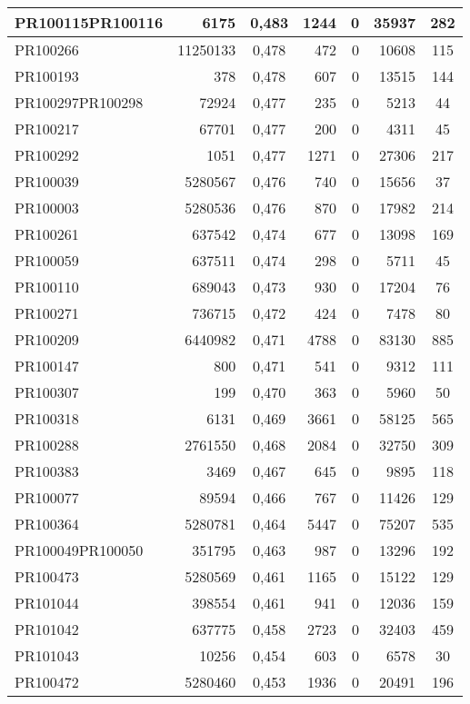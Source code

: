 \begin{center}
\begin{longtable}{lr|c|rrr|c}
	PR100115PR100116 & 6175 & 0,483 & 1244 & 0 & 35937 & 282 \\ \hline
	PR100266 & 11250133 & 0,478 & 472 & 0 & 10608 & 115 \\ \hline
	PR100193 & 378 & 0,478 & 607 & 0 & 13515 & 144 \\ \hline
	PR100297PR100298 & 72924 & 0,477 & 235 & 0 & 5213 & 44 \\ \hline
	PR100217 & 67701 & 0,477 & 200 & 0 & 4311 & 45 \\ \hline
	PR100292 & 1051 & 0,477 & 1271 & 0 & 27306 & 217 \\ \hline
	PR100039 & 5280567 & 0,476 & 740 & 0 & 15656 & 37 \\ \hline
	PR100003 & 5280536 & 0,476 & 870 & 0 & 17982 & 214 \\ \hline
	PR100261 & 637542 & 0,474 & 677 & 0 & 13098 & 169 \\ \hline
	PR100059 & 637511 & 0,474 & 298 & 0 & 5711 & 45 \\ \hline
	PR100110 & 689043 & 0,473 & 930 & 0 & 17204 & 76 \\ \hline
	PR100271 & 736715 & 0,472 & 424 & 0 & 7478 & 80 \\ \hline
	PR100209 & 6440982 & 0,471 & 4788 & 0 & 83130 & 885 \\ \hline
	PR100147 & 800 & 0,471 & 541 & 0 & 9312 & 111 \\ \hline
	PR100307 & 199 & 0,470 & 363 & 0 & 5960 & 50 \\ \hline
	PR100318 & 6131 & 0,469 & 3661 & 0 & 58125 & 565 \\ \hline
	PR100288 & 2761550 & 0,468 & 2084 & 0 & 32750 & 309 \\ \hline
	PR100383 & 3469 & 0,467 & 645 & 0 & 9895 & 118 \\ \hline
	PR100077 & 89594 & 0,466 & 767 & 0 & 11426 & 129 \\ \hline
	PR100364 & 5280781 & 0,464 & 5447 & 0 & 75207 & 535 \\ \hline
	PR100049PR100050 & 351795 & 0,463 & 987 & 0 & 13296 & 192 \\ \hline
	PR100473 & 5280569 & 0,461 & 1165 & 0 & 15122 & 129 \\ \hline
	PR101044 & 398554 & 0,461 & 941 & 0 & 12036 & 159 \\ \hline
	PR101042 & 637775 & 0,458 & 2723 & 0 & 32403 & 459 \\ \hline
	PR101043 & 10256 & 0,454 & 603 & 0 & 6578 & 30 \\ \hline
	PR100472 & 5280460 & 0,453 & 1936 & 0 & 20491 & 196 \\ \hline

\end{longtable}
\end{center}
